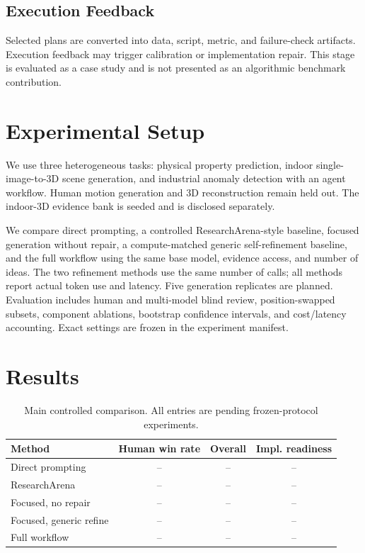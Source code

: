 \documentclass[letterpaper]{article}
\begin{document}
\subsection{Execution Feedback}
Selected plans are converted into data, script, metric, and failure-check artifacts. Execution feedback may trigger calibration or implementation repair. This stage is evaluated as a case study and is not presented as an algorithmic benchmark contribution.

\section{Experimental Setup}
We use three heterogeneous tasks: physical property prediction, indoor single-image-to-3D scene generation, and industrial anomaly detection with an agent workflow. Human motion generation and 3D reconstruction remain held out. The indoor-3D evidence bank is seeded and is disclosed separately.

We compare direct prompting, a controlled ResearchArena-style baseline, focused generation without repair, a compute-matched generic self-refinement baseline, and the full workflow using the same base model, evidence access, and number of ideas. The two refinement methods use the same number of calls; all methods report actual token use and latency. Five generation replicates are planned. Evaluation includes human and multi-model blind review, position-swapped subsets, component ablations, bootstrap confidence intervals, and cost/latency accounting. Exact settings are frozen in the experiment manifest.

\section{Results}
\begin{table}[t]
\centering
\small
\caption{Main controlled comparison. All entries are pending frozen-protocol experiments.}
\label{tab:main}
\begin{tabular}{lccc}
\toprule
Method & Human win rate & Overall & Impl. readiness \\
\midrule
Direct prompting & -- & -- & -- \\
ResearchArena & -- & -- & -- \\
Focused, no repair & -- & -- & -- \\
Focused, generic refine & -- & -- & -- \\
Full workflow & -- & -- & -- \\
\bottomrule
\end{tabular}
\end{table}
\end{document}
